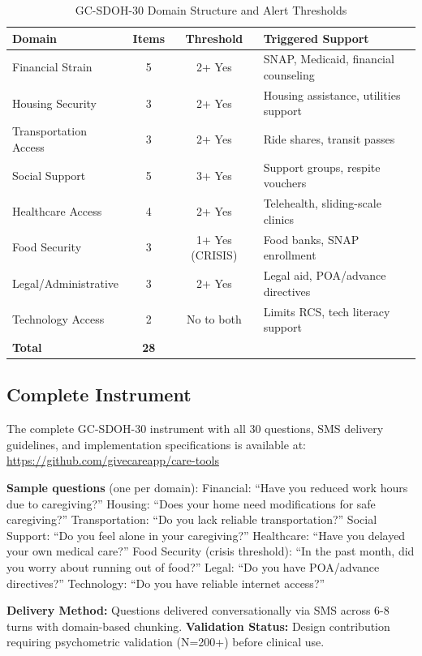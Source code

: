\documentclass{article}
\begin{document}
\begin{table}[htbp]
\centering
\caption{GC-SDOH-30 Domain Structure and Alert Thresholds}
\label{tab:gc-sdoh-domains}
\small
\begin{tabular}{lccl}
\toprule
\textbf{Domain} & \textbf{Items} & \textbf{Threshold} & \textbf{Triggered Support} \\
\midrule
Financial Strain & 5 & 2+ Yes & SNAP, Medicaid, financial counseling \\
Housing Security & 3 & 2+ Yes & Housing assistance, utilities support \\
Transportation Access & 3 & 2+ Yes & Ride shares, transit passes \\
Social Support & 5 & 3+ Yes & Support groups, respite vouchers \\
Healthcare Access & 4 & 2+ Yes & Telehealth, sliding-scale clinics \\
Food Security & 3 & 1+ Yes (CRISIS) & Food banks, SNAP enrollment \\
Legal/Administrative & 3 & 2+ Yes & Legal aid, POA/advance directives \\
Technology Access & 2 & No to both & Limits RCS, tech literacy support \\
\midrule
\textbf{Total} & \textbf{28} & & \\
\bottomrule
\end{tabular}
\end{table}
\subsection{Complete Instrument}%
The complete GC-SDOH-30 instrument with all 30 questions, SMS delivery guidelines, and implementation specifications is available at: \url{https://github.com/givecareapp/care-tools}

\textbf{Sample questions} (one per domain): Financial: ``Have you reduced work hours due to caregiving?'' Housing: ``Does your home need modifications for safe caregiving?'' Transportation: ``Do you lack reliable transportation?'' Social Support: ``Do you feel alone in your caregiving?'' Healthcare: ``Have you delayed your own medical care?'' Food Security (crisis threshold): ``In the past month, did you worry about running out of food?'' Legal: ``Do you have POA/advance directives?'' Technology: ``Do you have reliable internet access?''

\textbf{Delivery Method:} Questions delivered conversationally via SMS across 6-8 turns with domain-based chunking. \textbf{Validation Status:} Design contribution requiring psychometric validation (N=200+) before clinical use.
\end{document}
